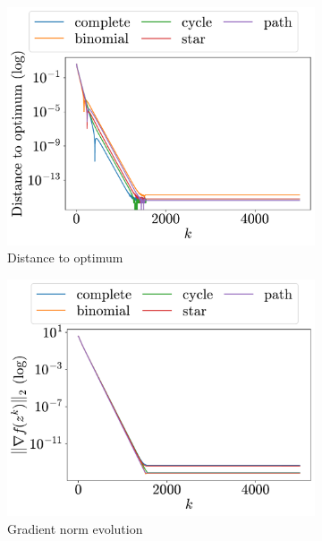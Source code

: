 \documentclass[a4paper,11pt,oneside]{book}
\begin{document}
\begin{figure}[H]
      \centering
      \begin{subfigure}[t]{0.46\linewidth}
            \centering
            \includegraphics[width=\linewidth]{./figs/quadratic/5_3/distance.pdf} 
            \caption{Distance to optimum}
      \end{subfigure}
      \hfill
      \begin{subfigure}[t]{0.46\linewidth}
            \centering
            \includegraphics[width=\linewidth]{./figs/quadratic/5_3/gradient.pdf} 
            \caption{Gradient norm evolution}
      \end{subfigure}
      \hfill
      \begin{subfigure}[t]{0.46\linewidth}

\end{subfigure}
\end{figure}
\end{document}
